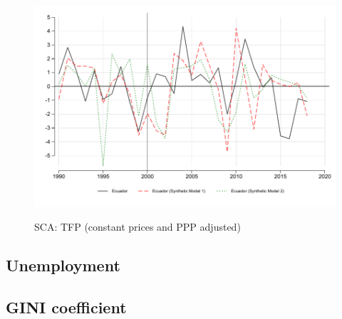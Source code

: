 \documentclass[12pt]{article}
\begin{document}


\begin{figure}[!htbp]
    \caption{SCA: TFP (constant prices and PPP adjusted)}
    \centering
    \includegraphics{STATA/Fig_TFP3_SCA.pdf}
    \label{fig:SCA_TFP}
\end{figure}

\subsection{Unemployment}

\subsection{GINI coefficient}



\newpage
\singlespacing
\printbibliography


\end{document}
